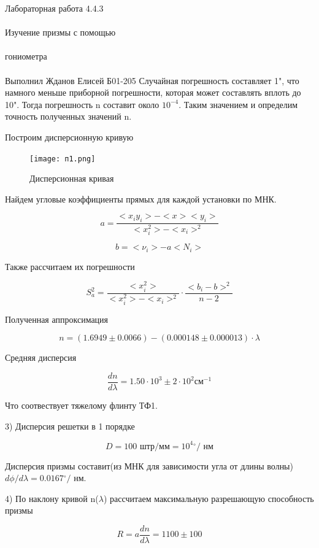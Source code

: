 \documentclass{astroedu-lab}
\begin{document}
\begin{problem}{\huge Лабораторная работа 4.4.3\\\\Изучение призмы с помощью\\\\гониометра\\\\Выполнил Жданов Елисей Б01-205}
Случайная погрешность составляет 1", что намного меньше приборной погрешности, которая может составлять вплоть до 10". Тогда погрешность n составит около $10^{-4}$. Таким значением и определим точность полученных значений n.

Построим дисперсионную кривую

	\begin{figure}[h]
		\begin{center}
			\texttt{[image: п1.png]}
			\caption{Дисперсионная кривая}
		\end{center}
	\end{figure}

Найдем угловые коэффициенты прямых для каждой установки по МНК.

\[
	a = \frac{<x_i y_i> - < x > < y_i >}{< x_i^2> - < x_i >^2}
\]

\[
	b = < \nu_i > - a < N_i >
\]

Также рассчитаем их погрешности

\begin{equation}
	S_a^2 = \frac{< x_i^2>}{< x_i^2 > - < x_i >^2} \cdot \frac{<  b_i - b > ^2}{n - 2}
\end{equation}

Полученная аппроксимация

\begin{equation}
	 n = (1.6949 \pm 0.0066) - (0.000148 \pm 0.000013) \cdot \lambda
\end{equation}

Средняя дисперсия

\begin{equation}
	 \frac{d n}{d \lambda} = 1.50 \cdot 10^3 \pm 2 \cdot 10^2 \text{см}^{-1}
\end{equation}
	
Что соотвествует тяжелому флинту ТФ1.

3) Дисперсия решетки в 1 порядке

\begin{equation}
	 D = 100 \text{ штр/мм} = 10^4 {}^\circ / \text{ нм}
\end{equation}

Дисперсия призмы составит(из МНК для зависимости угла от длины волны) $d \phi/d \lambda = 0.0167 {}^\circ / \text{ нм}$. 

4) По наклону кривой n($\lambda$) рассчитаем максимальную разрешающую способность призмы

\begin{equation}
	 R = a \frac{d n}{d \lambda} = 1100 \pm 100
\end{equation}


\end{problem}
\end{document}
